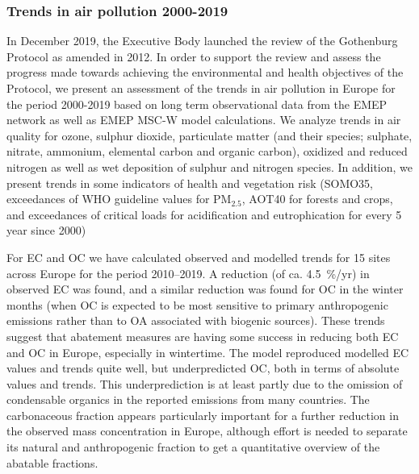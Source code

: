 
\subsubsection*{Trends in air pollution 2000-2019}
In December 2019, the Executive Body launched the review of the Gothenburg Protocol as amended in 2012. In order to support the review and assess the progress made towards achieving the environmental and health objectives of the Protocol, we present an assessment of the trends in air pollution in Europe for the period 2000-2019 based on long term observational data from the EMEP network as well as EMEP MSC-W model calculations.
We analyze trends in air quality for ozone, sulphur dioxide, particulate matter (and their species; sulphate, nitrate, ammonium, elemental carbon and organic carbon), oxidized and reduced nitrogen as well as wet deposition of sulphur and nitrogen species. In addition, we present trends in some indicators of health and vegetation risk (SOMO35, exceedances of WHO guideline values for PM$_{2.5}$, AOT40 for forests and crops, and exceedances of critical loads for acidification and eutrophication for every 5 year since 2000)





For EC and OC we have calculated observed and modelled trends for 15 sites across Europe for the period 2010--2019. A reduction (of ca. 4.5~\%/yr) in observed EC was found, and a similar reduction was found for OC in the winter months (when OC is expected to be most sensitive to primary anthropogenic emissions rather than to OA associated with biogenic sources). These trends suggest that abatement measures are having some success in reducing both EC and OC in Europe, especially in wintertime.  The model reproduced modelled EC values and trends quite well, but underpredicted OC, both in terms of absolute values and trends. This underprediction is at least partly due to the omission of condensable organics in the reported emissions from many countries. 
%
The carbonaceous fraction appears particularly important for a
further reduction in the observed \pmfine mass concentration in Europe,
although effort is needed to separate its natural and anthropogenic
fraction to get a quantitative overview of the abatable fractions.


